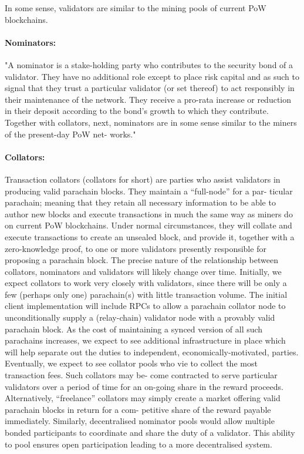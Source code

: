 In some sense, validators are similar to the mining pools of current PoW blockchains.

\paragraph{Nominators:} \label{par:nominators} "A nominator is a stake-holding party who contributes to the security bond of a validator. They have no additional role except to place risk capital and as such to signal that they trust a particular validator (or set thereof) to act responsibly in their maintenance of the network. They receive a pro-rata increase or reduction in their deposit according to the bond’s growth to which they contribute.
Together with collators, next, nominators are in some sense similar to the miners of the present-day PoW net- works."


\paragraph{Collators: } \label{par:collators} Transaction collators (collators for short) are parties who assist validators in producing valid parachain blocks. They maintain a “full-node” for a par- ticular parachain; meaning that they retain all necessary information to be able to author new blocks and execute transactions in much the same way as miners do on current PoW blockchains. Under normal circumstances, they will collate and execute transactions to create an unsealed block, and provide it, together with a zero-knowledge proof, to one or more validators presently responsible for proposing a parachain block.
The precise nature of the relationship between collators, nominators and validators will likely change over time. Initially, we expect collators to work very closely with validators, since there will be only a few (perhaps only one) parachain(s) with little transaction volume. The initial client implementation will include RPCs to allow a parachain collator node to unconditionally supply a (relay-chain) validator node with a provably valid parachain block. As the cost of maintaining a synced version of all such parachains increases, we expect to see additional infrastructure in place which will help separate out the duties to independent, economically-motivated, parties.
Eventually, we expect to see collator pools who vie to collect the most transaction fees. Such collators may be- come contracted to serve particular validators over a period of time for an on-going share in the reward proceeds. Alternatively, “freelance” collators may simply create a market offering valid parachain blocks in return for a com- petitive share of the reward payable immediately. Similarly, decentralised nominator pools would allow multiple bonded participants to coordinate and share the duty of a validator. This ability to pool ensures open participation leading to a more decentralised system.

